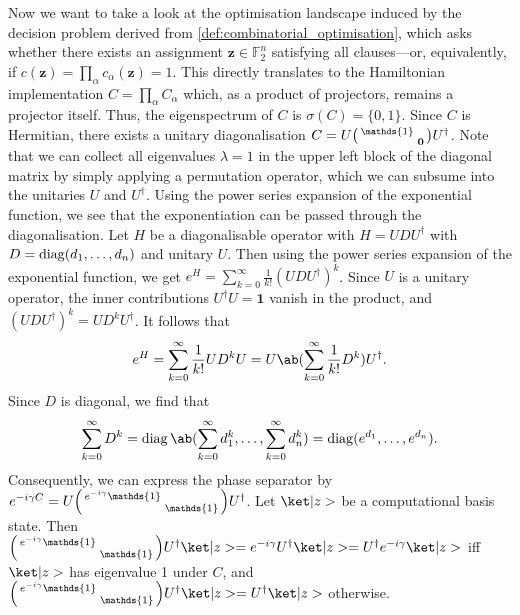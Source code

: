 Now we want to take a look at the optimisation landscape induced by the decision problem derived from \cref{def:combinatorial_optimisation}, which asks whether there exists an assignment $\bm{z} \in \mathds{F}_2^n$ satisfying all clauses---or, equivalently, if $c(\bm{z}) = \prod_{\alpha} c_\alpha(\bm{z}) = 1$. This directly translates to the Hamiltonian implementation $C = \prod_\alpha C_\alpha$ which, as a product of projectors, remains a projector itself. Thus, the eigenspectrum of $C$ is $\sigma(C) = \{0,1\}$. Since $C$ is Hermitian, there exists a unitary diagonalisation $C = U \begin{psmallmatrix} \mathds{1} &  \\ & \bm{0}  \end{psmallmatrix} U^\dag$. Note that we can collect all eigenvalues $\lambda = 1$ in the upper left block of the diagonal matrix by simply applying a permutation operator, which we can subsume into the unitaries $U$ and $U^\dagger$. Using the power series expansion of the exponential function, we see that the exponentiation can be passed through the diagonalisation. Let $H$ be a diagonalisable operator with $H = U D U^\dagger$ with $D = \operatorname*{diag} (d_1, \dots, d_n)$ and unitary $U$. Then using the power series expansion of the exponential function, we get $e^H = \sum_{k = 0}^\infty \frac{1}{k!} (U D U^\dagger)^k$. Since $U$ is a unitary operator, the inner contributions $U^\dagger U=\bm{1}$ vanish in the product, and $(U D U^\dagger)^k = U D^k U^\dagger$. It follows that 
% 
\begin{equation}
e^H = \sum_{k = 0}^\infty \frac{1}{k!} U D^k U = U \ab(\sum_{k = 0}^\infty \frac{1}{k!} D^k) U^\dagger. 
\end{equation}
%
Since $D$ is diagonal, we find that
%
\begin{equation}
\sum_{k = 0}^\infty D^k = \diag \ab(\sum_{k = 0}^\infty d_1^k, \dots, \sum_{k = 0}^\infty d_n^k) = \diag(e^{d_1}, \dots, e^{d_n}).
\end{equation}
%
Consequently, we can express the phase separator by \(e^{-i \pangle C} = U \begin{psmallmatrix} e^{-i \pangle} \mathds{1} & \\ & \mathds{1} \end{psmallmatrix} U^\dag\).
%
Let $\ket|z>$ be a computational basis state. Then
\(\begin{psmallmatrix} e^{-i \pangle} \mathds{1} & \\ & \mathds{1} \end{psmallmatrix} U^\dag \ket|z> = e^{-i \pangle} U^\dag \ket|z> = U^\dag e^{-i \pangle} \ket|z>\) iff $\ket|z>$ has eigenvalue 1 under $C$, and \(\begin{psmallmatrix} e^{-i \pangle} \mathds{1} & \\ & \mathds{1} \end{psmallmatrix} U^\dag \ket|z> = U^\dag \ket|z>  \) otherwise.

